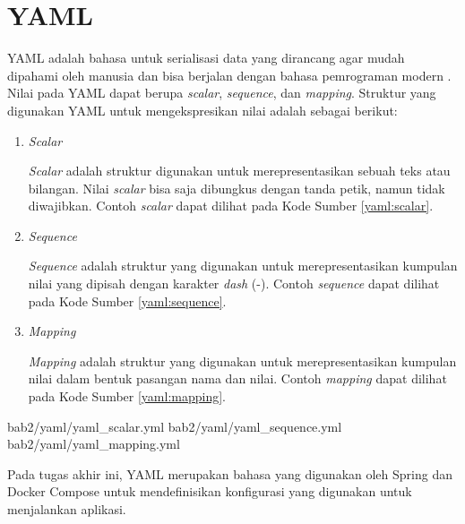 \section{YAML}
\par YAML adalah bahasa untuk serialisasi data yang dirancang agar mudah dipahami oleh manusia dan bisa berjalan dengan bahasa pemrograman modern \cite{yaml-online}. Nilai pada YAML dapat berupa \textit{scalar}, \textit{sequence}, dan \textit{mapping}. Struktur yang digunakan YAML untuk mengekspresikan nilai adalah sebagai berikut:
\begin{enumerate}[listparindent=2.5em]
	\item \textit{Scalar}
	\par \textit{Scalar} adalah struktur digunakan untuk merepresentasikan sebuah teks atau bilangan. Nilai \textit{scalar} bisa saja dibungkus dengan tanda petik, namun tidak diwajibkan. Contoh \textit{scalar} dapat dilihat pada Kode Sumber \ref{yaml:scalar}.
	\item \textit{Sequence}
	\par \textit{Sequence} adalah struktur yang digunakan untuk merepresentasikan kumpulan nilai yang dipisah dengan karakter \textit{dash} (-). Contoh \textit{sequence} dapat dilihat pada Kode Sumber \ref{yaml:sequence}.
	\item \textit{Mapping}
	\par \textit{Mapping} adalah struktur yang digunakan untuk merepresentasikan kumpulan nilai dalam bentuk pasangan nama dan nilai. Contoh \textit{mapping} dapat dilihat pada Kode Sumber \ref{yaml:mapping}.
\end{enumerate}
 {bab2/yaml/yaml_scalar.yml}
 {bab2/yaml/yaml_sequence.yml}
 {bab2/yaml/yaml_mapping.yml}
\par Pada tugas akhir ini, YAML merupakan bahasa yang digunakan oleh Spring dan Docker Compose untuk mendefinisikan konfigurasi yang digunakan untuk menjalankan aplikasi.
